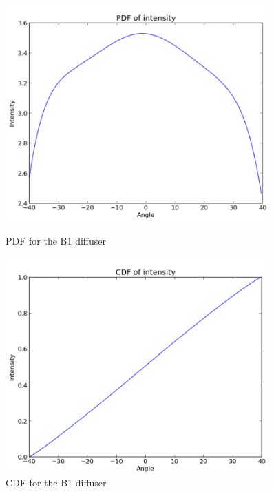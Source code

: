 \begin{figure}
    \centering
    \label{fig:B1_PDF_CDF_diff}
    \begin{minipage}{0.45\textwidth}
        \centering
        \includegraphics[width=0.9\textwidth]{Figures/B1_diff_pdf.png} %
        \caption{PDF for the B1 diffuser}
    \end{minipage}\hfill
    \begin{minipage}{0.45\textwidth}
        \centering
        \includegraphics[width=0.9\textwidth]{Figures/B1_diff_cdf.PNG} %
        \caption{CDF for the B1 diffuser}
    \end{minipage}
\end{figure}


